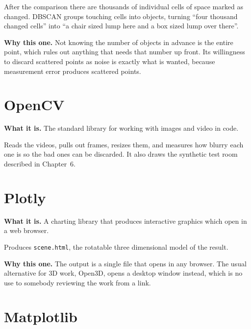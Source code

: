 \begin{project}
After the comparison there are thousands of individual cells of space marked as changed. DBSCAN
groups touching cells into objects, turning ``four thousand changed cells'' into ``a chair sized
lump here and a box sized lump over there''.
\end{project}

\textbf{Why this one.} Not knowing the number of objects in advance is the entire point, which
rules out anything that needs that number up front. Its willingness to discard scattered points as
noise is exactly what is wanted, because measurement error produces scattered points.

\section{OpenCV}

\begin{plainbox}
\textbf{What it is.} The standard library for working with images and video in code.
\end{plainbox}

\begin{project}
Reads the videos, pulls out frames, resizes them, and measures how blurry each one is so the bad
ones can be discarded. It also draws the synthetic test room described in Chapter~6.
\end{project}

\section{Plotly}

\begin{plainbox}
\textbf{What it is.} A charting library that produces interactive graphics which open in a web
browser.
\end{plainbox}

\begin{project}
Produces \texttt{scene.html}, the rotatable three dimensional model of the result.
\end{project}

\textbf{Why this one.} The output is a single file that opens in any browser. The usual
alternative for 3D work, Open3D, opens a desktop window instead, which is no use to somebody
reviewing the work from a link.

\section{Matplotlib}

